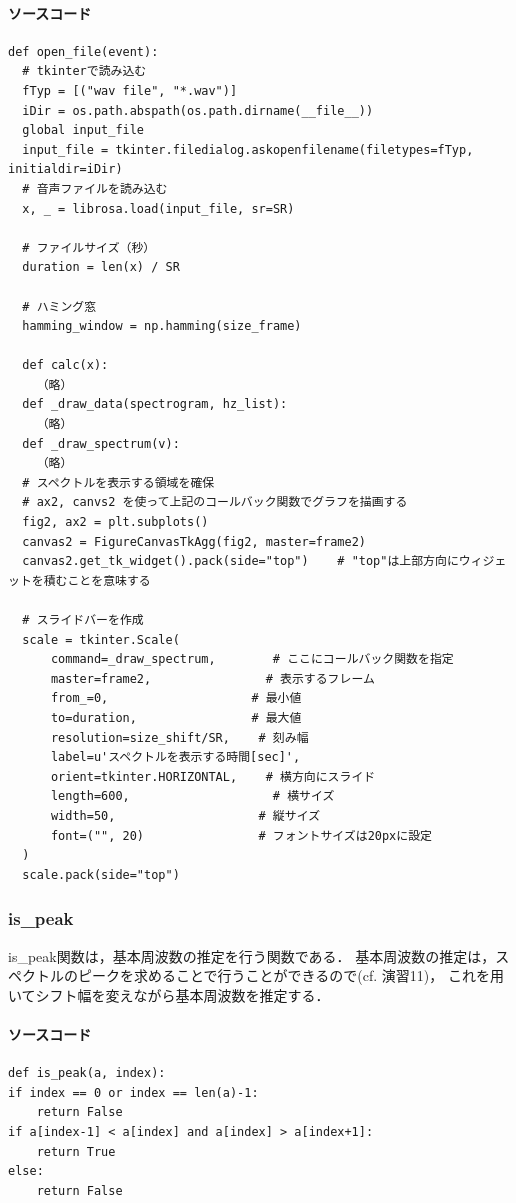 \documentclass[11pt,a4j]{jarticle}%
\begin{document}
\paragraph*{ソースコード}
\begin{lstlisting}[caption=openfile関数,label=openfile]
def open_file(event):
  # tkinterで読み込む
  fTyp = [("wav file", "*.wav")]
  iDir = os.path.abspath(os.path.dirname(__file__))
  global input_file
  input_file = tkinter.filedialog.askopenfilename(filetypes=fTyp, initialdir=iDir)
  # 音声ファイルを読み込む
  x, _ = librosa.load(input_file, sr=SR)

  # ファイルサイズ（秒）
  duration = len(x) / SR

  # ハミング窓
  hamming_window = np.hamming(size_frame)

  def calc(x):
    （略）
  def _draw_data(spectrogram, hz_list):
    （略）
  def _draw_spectrum(v):
    （略）
  # スペクトルを表示する領域を確保
  # ax2, canvs2 を使って上記のコールバック関数でグラフを描画する
  fig2, ax2 = plt.subplots()
  canvas2 = FigureCanvasTkAgg(fig2, master=frame2)
  canvas2.get_tk_widget().pack(side="top")    # "top"は上部方向にウィジェットを積むことを意味する

  # スライドバーを作成
  scale = tkinter.Scale(
      command=_draw_spectrum,        # ここにコールバック関数を指定
      master=frame2,                # 表示するフレーム
      from_=0,                    # 最小値
      to=duration,                # 最大値
      resolution=size_shift/SR,    # 刻み幅
      label=u'スペクトルを表示する時間[sec]',
      orient=tkinter.HORIZONTAL,    # 横方向にスライド
      length=600,                    # 横サイズ
      width=50,                    # 縦サイズ
      font=("", 20)                # フォントサイズは20pxに設定
  )
  scale.pack(side="top")
\end{lstlisting}
\subsubsection{is\_peak}
is\_peak関数は，基本周波数の推定を行う関数である．
基本周波数の推定は，スペクトルのピークを求めることで行うことができるので(cf. 演習11)，
これを用いてシフト幅を変えながら基本周波数を推定する．
\paragraph*{ソースコード}
\begin{lstlisting}[caption=is\_peak関数,label=openfile]
def is_peak(a, index):
if index == 0 or index == len(a)-1:
    return False
if a[index-1] < a[index] and a[index] > a[index+1]:
    return True
else:
    return False

\end{lstlisting}
\end{document}
